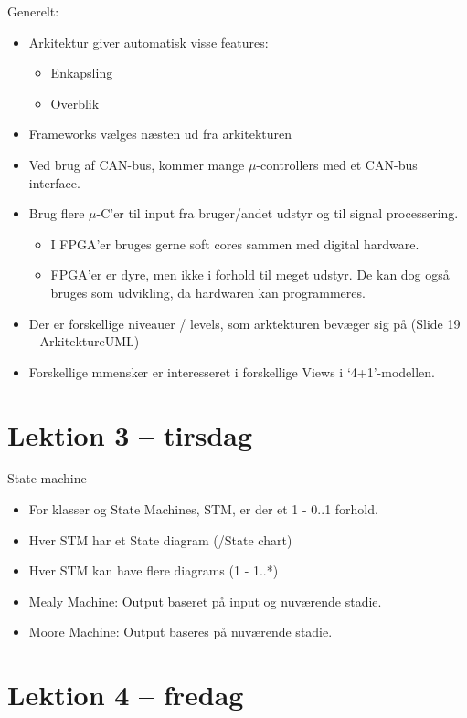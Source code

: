 \documentclass{article}
\begin{document}
Generelt:
\begin{itemize}
	\item Arkitektur giver automatisk visse features:
	\begin{itemize}
		\item Enkapsling
		\item Overblik
	\end{itemize}
	\item Frameworks vælges næsten ud fra arkitekturen
	\item Ved brug af CAN-bus, kommer mange $\mu$-controllers med et CAN-bus interface.
	\item Brug flere $\mu$-C'er til input fra bruger/andet udstyr og til signal processering.
	\begin{itemize}
		\item I FPGA'er bruges gerne soft cores sammen med digital hardware. 
		\item FPGA'er er dyre, men ikke i forhold til meget udstyr. De kan dog også bruges som udvikling, da hardwaren kan programmeres.
	\end{itemize}

	\item Der er forskellige niveauer / levels, som arktekturen bevæger sig på (Slide 19 -- ArkitektureUML)


	\item Forskellige mmensker er interesseret i forskellige Views i `4+1'-modellen.
\end{itemize}


\section{Lektion 3 -- tirsdag}

State machine
\begin{itemize}
	\item For klasser og State Machines, STM, er der et 1 - 0..1 forhold.
	\item Hver STM har et State diagram (/State chart)
	\item Hver STM kan have flere diagrams (1 - 1..*)
	\item Mealy Machine: Output baseret på input og nuværende stadie.
	\item Moore Machine: Output baseres på nuværende stadie.
\end{itemize}


\section{Lektion 4 -- fredag}
\end{document}
